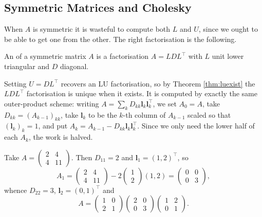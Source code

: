 \documentclass[a4paper]{scrartcl}
\begin{document}
\subsection{Symmetric Matrices and Cholesky}

When $A$ is symmetric it is wasteful to compute both $L$ and $U$, since we ought to be able to get one from the other. The right factorisation is the following.

\begin{definition}
  An  of a symmetric matrix $A$ is a factorisation $A = LDL^\top$ with $L$ unit lower triangular and $D$ diagonal.
\end{definition}

Setting $U = DL^\top$ recovers an LU factorisation, so by Theorem \ref{thm:luexist} the $LDL^\top$ factorisation is unique when it exists. It is computed by exactly the same outer-product scheme: writing $A = \sum_k D_{kk}\mathbf{l}_k\mathbf{l}_k^\top$, we set $A_0 = A$, take $D_{kk} = (A_{k-1})_{kk}$, take $\mathbf{l}_k$ to be the $k$-th column of $A_{k-1}$ scaled so that $(\mathbf{l}_k)_k = 1$, and put $A_k = A_{k-1} - D_{kk}\mathbf{l}_k\mathbf{l}_k^\top$. Since we only need the lower half of each $A_k$, the work is halved.

\begin{example}
  Take $A = \begin{pmatrix}2&4\\4&11\end{pmatrix}$. Then $D_{11} = 2$ and $\mathbf{l}_1 = (1,2)^\top$, so
  $$
  A_1 = \begin{pmatrix}2&4\\4&11\end{pmatrix} - 2\begin{pmatrix}1\\2\end{pmatrix}(1,2) = \begin{pmatrix}0&0\\0&3\end{pmatrix},
  $$
  whence $D_{22} = 3$, $\mathbf{l}_2 = (0,1)^\top$ and
  $$
  A = \begin{pmatrix}1&0\\2&1\end{pmatrix}\begin{pmatrix}2&0\\0&3\end{pmatrix}\begin{pmatrix}1&2\\0&1\end{pmatrix}.
  $$
\end{example}
\end{document}
